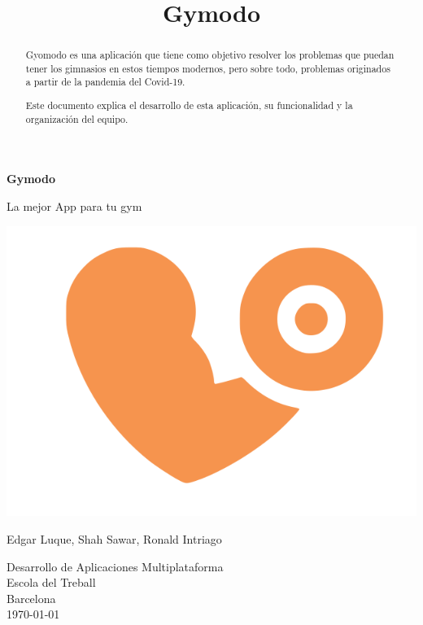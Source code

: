 \documentclass[12pt,a4paper]{article}
\title{Gymodo}
\begin{document}
\begin{titlepage}
    \begin{center}
        \vspace*{1cm}
            
        \Huge
        \textbf{Gymodo}
            
        \vspace{0.5cm}
        \LARGE
        La mejor App para tu gym
        
        \includegraphics[width=\textwidth]{gymodo_logo}
        
        \vfill
        

        Edgar Luque, Shah Sawar, Ronald Intriago\\
            
        \vspace{0.8cm}
           
            
        \Large
        Desarrollo de Aplicaciones Multiplataforma\\
        Escola del Treball\\
        Barcelona\\
        \today
            
    \end{center}
\end{titlepage}

\newpage

\begin{abstract}
Gyomodo es una aplicación que tiene como objetivo resolver los problemas que puedan tener los gimnasios en estos tiempos modernos, pero sobre todo, problemas originados a partir de la pandemia del Covid-19.

Este documento explica el desarrollo de esta aplicación, su funcionalidad y la organización del equipo.
\end{abstract}
\end{document}
